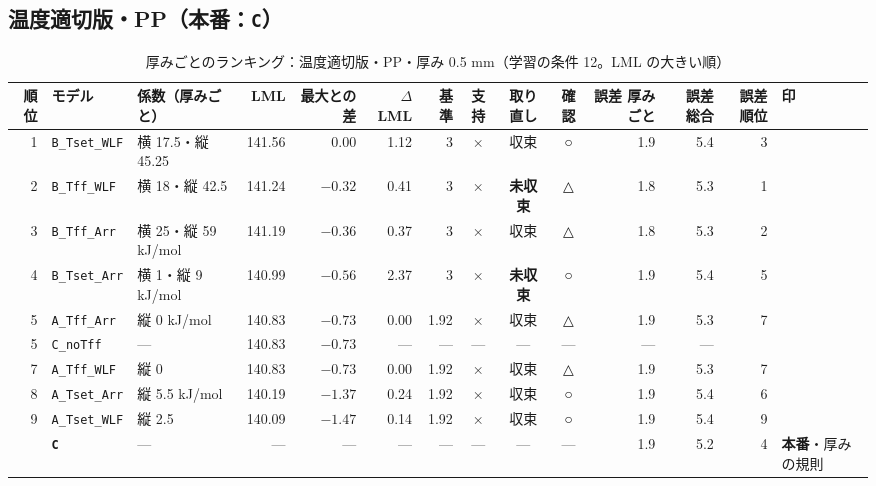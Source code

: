 \documentclass[paper=a4paper,landscape,fontsize=10pt,line_length=62zw,number_of_lines=34]{jlreq}
\let\origtextbf\textbf
\renewcommand{\textbf}[1]{\origtextbf{\gtfamily #1}}   %
\begin{document}
\subsection{温度適切版・PP（本番：\texttt{C}）}
\begin{table}[H]\centering\footnotesize
\caption{厚みごとのランキング：温度適切版・PP・厚み 0.5 mm（学習の条件 12。LML の大きい順）}
\begin{tabular}{rlp{11\zw}rrrrccc rrrl}
\toprule
順位 & モデル & 係数（厚みごと） & LML & 最大との差 & $\Delta$LML & 基準 & 支持 & 取り直し & 確認 & 誤差 厚みごと & 誤差 総合 & 誤差順位 & 印 \\
\midrule
1 & \texttt{B\_\allowbreak{}Tset\_\allowbreak{}WLF} & 横 17.5・縦 45.25 & 141.56 & 0.00 & 1.12 & 3 & × & 収束 & ○ & 1.9 & 5.4 & 3 &  \\
2 & \texttt{B\_\allowbreak{}Tff\_\allowbreak{}WLF} & 横 18・縦 42.5 & 141.24 & $-0.32$ & 0.41 & 3 & × & \textbf{未収束} & △ & 1.8 & 5.3 & 1 &  \\
3 & \texttt{B\_\allowbreak{}Tff\_\allowbreak{}Arr} & 横 25・縦 59 kJ/mol & 141.19 & $-0.36$ & 0.37 & 3 & × & 収束 & △ & 1.8 & 5.3 & 2 &  \\
4 & \texttt{B\_\allowbreak{}Tset\_\allowbreak{}Arr} & 横 1・縦 9 kJ/mol & 140.99 & $-0.56$ & 2.37 & 3 & × & \textbf{未収束} & ○ & 1.9 & 5.4 & 5 &  \\
5 & \texttt{A\_\allowbreak{}Tff\_\allowbreak{}Arr} & 縦 0 kJ/mol & 140.83 & $-0.73$ & 0.00 & 1.92 & × & 収束 & △ & 1.9 & 5.3 & 7 &  \\
5 & \texttt{C\_\allowbreak{}noTff} & --- & 140.83 & $-0.73$ & --- & --- & --- & --- & --- & --- & --- &  &  \\
7 & \texttt{A\_\allowbreak{}Tff\_\allowbreak{}WLF} & 縦 0 & 140.83 & $-0.73$ & 0.00 & 1.92 & × & 収束 & △ & 1.9 & 5.3 & 7 &  \\
8 & \texttt{A\_\allowbreak{}Tset\_\allowbreak{}Arr} & 縦 5.5 kJ/mol & 140.19 & $-1.37$ & 0.24 & 1.92 & × & 収束 & ○ & 1.9 & 5.4 & 6 &  \\
9 & \texttt{A\_\allowbreak{}Tset\_\allowbreak{}WLF} & 縦 2.5 & 140.09 & $-1.47$ & 0.14 & 1.92 & × & 収束 & ○ & 1.9 & 5.4 & 9 &  \\
 & \textbf{\texttt{C}} & --- & --- & --- & --- & --- & --- & --- & --- & 1.9 & 5.2 & 4 & \textbf{本番}・厚みの規則 \\
\bottomrule
\end{tabular}
\end{table}
\end{document}
